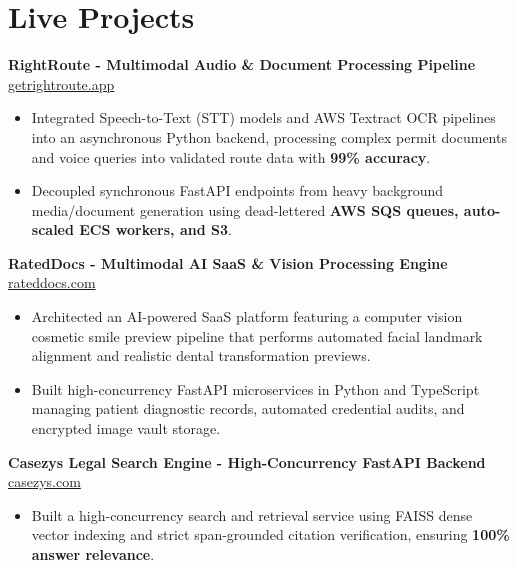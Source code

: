\documentclass[9.5pt,a4paper]{article}
\begin{document}
\section*{Live Projects}
\noindent
\textbf{RightRoute - Multimodal Audio \& Document Processing Pipeline} \hfill \href{https://getrightroute.app}{getrightroute.app}
\begin{itemize}
    \item Integrated Speech-to-Text (STT) models and AWS Textract OCR pipelines into an asynchronous Python backend, processing complex permit documents and voice queries into validated route data with \textbf{99\% accuracy}.
    \item Decoupled synchronous FastAPI endpoints from heavy background media/document generation using dead-lettered \textbf{AWS SQS queues, auto-scaled ECS workers, and S3}.
\end{itemize}
\vspace{0.6pt}
\noindent
\textbf{RatedDocs - Multimodal AI SaaS \& Vision Processing Engine} \hfill \href{https://rateddocs.com}{rateddocs.com}
\begin{itemize}
    \item Architected an AI-powered SaaS platform featuring a computer vision cosmetic smile preview pipeline that performs automated facial landmark alignment and realistic dental transformation previews.
    \item Built high-concurrency FastAPI microservices in Python and TypeScript managing patient diagnostic records, automated credential audits, and encrypted image vault storage.
\end{itemize}
\vspace{0.6pt}
\noindent
\textbf{Casezys Legal Search Engine - High-Concurrency FastAPI Backend} \hfill \href{https://casezys.com}{casezys.com}
\begin{itemize}
    \item Built a high-concurrency search and retrieval service using FAISS dense vector indexing and strict span-grounded citation verification, ensuring \textbf{100\% answer relevance}.
\end{itemize}
\vspace{0.6pt}
\end{document}
